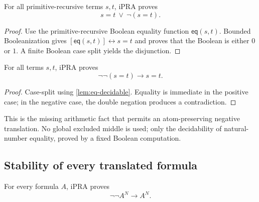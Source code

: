 \begin{lemma}
\label{lem:eq-decidable}
For all primitive-recursive terms \(s,t\), iPRA proves
\[
  s=t\ \vee\ \neg(s=t).
\]
\end{lemma}

\begin{proof}
Use the primitive-recursive Boolean equality function \(\mathsf{eq}(s,t)\).  Bounded Booleanization gives
\(
 [\mathsf{eq}(s,t)]\leftrightarrow s=t
\)
and proves that the Boolean is either \(0\) or \(1\).  A finite Boolean case split yields the disjunction.
\end{proof}

\begin{corollary}
\label{cor:eq-stability}
For all terms \(s,t\), iPRA proves
\[
  \neg\neg(s=t)\to s=t.
\]
\end{corollary}

\begin{proof}
Case-split using \cref{lem:eq-decidable}.  Equality is immediate in the positive case; in the negative case, the double negation produces a contradiction.
\end{proof}

This is the missing arithmetic fact that permits an atom-preserving negative translation.  No global excluded middle is used; only the decidability of natural-number equality, proved by a fixed Boolean computation.

\subsection{Stability of every translated formula}

\begin{theorem}
\label{thm:negative-stability}
For every formula \(A\), iPRA proves
\[
  \neg\neg A^N\to A^N.
\]
\end{theorem}

